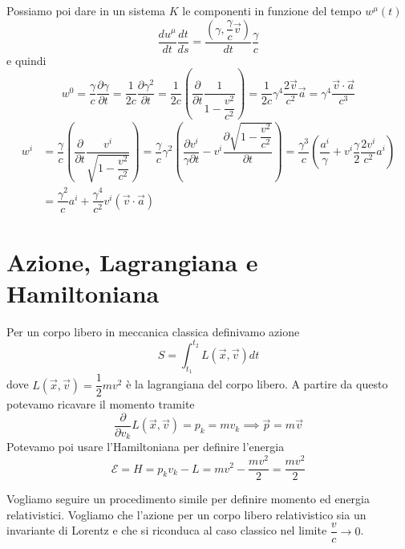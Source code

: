 \documentclass[12pt,a4paper,titlepage, twoside, openright]{book}
\numberwithin{equation}{chapter}
\begin{document}
Possiamo poi dare in un sistema $K$ le componenti in funzione del tempo $w^\mu(t)$
\[
\dfrac{du^\mu}{dt}\dfrac{dt}{ds}=\dfrac{\left(\gamma,\dfrac{\gamma}{c}\vec{v}\right)}{dt} \dfrac{\gamma}{c} 
\] 
e quindi
\begin{equation}
w^0=\dfrac{\gamma}{c}\dfrac{\partial \gamma}{\partial t}=\dfrac{1}{2c}\dfrac{\partial \gamma^2}{\partial t}=\dfrac{1}{2c}\left(\dfrac{\partial}{\partial t} \dfrac{1}{1-\dfrac{v^2}{c^2}} \right)= \dfrac{1}{2c} \gamma^4 \dfrac{2\vec{v}}{c^2}\vec{a}=\gamma^4 \dfrac{\vec{v}\cdot\vec{a}}{c^3}
\end{equation}\begin{equation}\begin{split}
w^i&=\dfrac{\gamma}{c}\left(\dfrac{\partial}{\partial t} \dfrac{v^i}{\sqrt{1-\dfrac{v^2}{c^2}}} \right) = \dfrac{\gamma}{c} \gamma^2 \left( \dfrac{\partial v^i}{\gamma\partial t} - v^i \dfrac{\partial \sqrt{1-\dfrac{v^2}{c^2}}}{\partial t}  \right)= 
\dfrac{\gamma^3}{c} \left( \dfrac{a^i}{\gamma} + v^i \dfrac{\gamma}{2} \dfrac{2 v^i}{c^2} a^i \right) \\&= \dfrac{\gamma^2}{c} a^i + \dfrac{\gamma^4}{c^2}v^i \left( \vec{v} \cdot \vec{a} \right)\end{split}
\end{equation}

\section{Azione, Lagrangiana e Hamiltoniana}\label{sezAzione}
Per un corpo libero in meccanica classica definivamo azione
\[
S=\int_{t_1}^{t_2} L(\vec{x},\vec{v}) dt
\]
dove $L(\vec{x},\vec{v})=\dfrac{1}{2}mv^2$ è la lagrangiana del corpo libero. A partire da questo potevamo ricavare il momento tramite
\[
\dfrac{\partial}{\partial v_k} L(\vec{x},\vec{v}) = p_k = mv_k \implies \vec{p} = m\vec{v}
\]
Potevamo poi usare l'Hamiltoniana per definire l'energia
\[
\mathcal{E} = H = p_k v_k - L = mv^2 - \dfrac{mv^2}{2} = \dfrac{mv^2}{2}
\]

Vogliamo seguire un procedimento simile per definire momento ed energia relativistici.
Vogliamo che l'azione per un corpo libero relativistico sia un invariante di Lorentz e che si riconduca al caso classico nel limite $\dfrac{v}{c}\rightarrow 0$.
\end{document}

